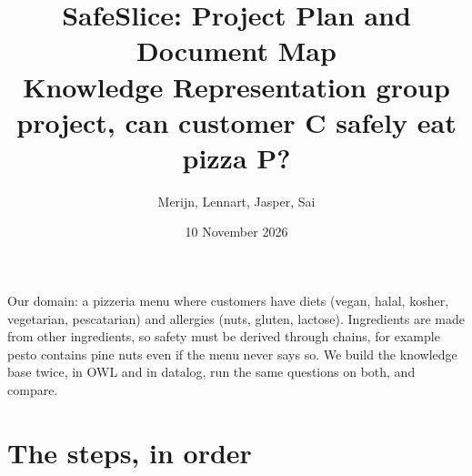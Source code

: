 \documentclass[11pt,a4paper]{article}
\title{SafeSlice: Project Plan and Document Map\\ \large Knowledge Representation group project, can customer C safely eat pizza P?}
\author{Merijn, Lennart, Jasper, Sai}
\date{10 November 2026}
\begin{document}
\maketitle

\noindent Our domain: a pizzeria menu where customers have diets (vegan, halal, kosher, vegetarian, pescatarian) and allergies (nuts, gluten, lactose). Ingredients are made from other ingredients, so safety must be derived through chains, for example pesto contains pine nuts even if the menu never says so. We build the knowledge base twice, in OWL and in datalog, run the same questions on both, and compare.

\section*{The steps, in order}
\end{document}

